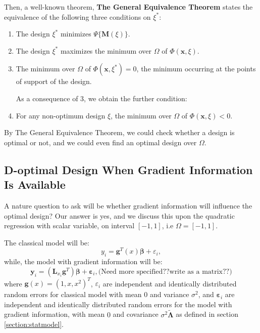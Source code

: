 \documentclass[preprint,12pt]{elsarticle}
\begin{document}
Then, a well-known theorem, \textbf{The General Equivalence Theorem}
states the equivalence of the following three conditions on $\xi^*$:
\begin{enumerate}
\item The design $\xi^*$ minimizes $\Psi\{\boldsymbol{M}(\xi)\}$.
\item The design $\xi^*$ maximizes the minimum over $\Omega$ of
$\Phi(\boldsymbol{x},\xi)$.
\item The minimum over $\Omega$ of
$\Phi(\boldsymbol{x},\xi^*)=0$, the minimum occurring at the points
of support of the design.

As a consequence of $3$, we obtain the further condition:
\item For any non-optimum design $\xi$, the minimum over
$\Omega$ of $\Phi(\boldsymbol{x},\xi)<0$.
\end{enumerate}

By The General Equivalence Theorem, we could check whether a design
is optimal or not, and we could even find an optimal design over
$\Omega$.

\subsection{D-optimal Design When Gradient Information Is Available}
\label{section:Dopt}

A nature question to ask will be whether
gradient information will influence the optimal design? Our answer
is yes, and we discuss this upon the quadratic regression with
scalar variable, on interval $[-1,1]$, i.e $\Omega=[-1,1]$.

The classical model will be:
$$y_i=\boldsymbol{g}^T(x)\boldsymbol{\beta}+\varepsilon_i,$$
while, the model with gradient information will be:
$$\boldsymbol{y}_i=(\mathbf{L}_{x_i}\boldsymbol{g}^T)\boldsymbol{\beta}+\boldsymbol{\varepsilon}_i,\text{(Need more specified??write as a matrix??)}$$
where $\boldsymbol{g}(x)=(1,x,x^2)^T$, $\varepsilon_i$ are
independent and identically distributed random errors for classical
model with mean $0$ and variance $\sigma^2$, and
$\boldsymbol{\varepsilon}_i$ are independent and identically
distributed random errors for the model with gradient information,
with mean $0$ and covariance
$\sigma^2\widetilde{\boldsymbol{\Lambda}}$ as defined in section
\ref{section:statmodel}.
\end{document}
